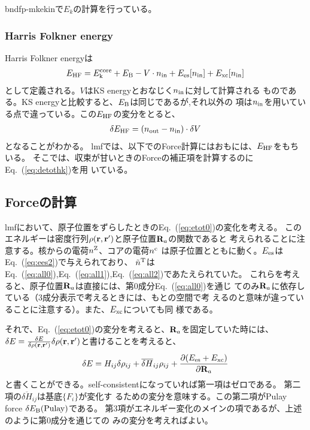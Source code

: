 \documentclass[a4paper,10pt,aip,onecolumn,amsmath,amssymb,floatfix,rmp]{revtex4-1}
\newcommand{\bfr}{{\bf r}}
\newcommand{\bfR}{{\bf R}}
\newcommand{\req}[1]{\mbox{Eq.~\!(\ref{#1})}}
\def\tnT{\tilde{n}^{\rm T}}
\def\tnT{\tilde{n}^{\rm T}}
\begin{document}
\noindent * bndfp-mkekinで$E_k$の計算を行っている。

\subsubsection{Harris Folkner energy}
Harris Folkner energyは
\begin{eqnarray}
E_{\rm HF} = E_{\rm k}^{\rm core} + E_{\rm B} - V \cdot n_{\rm in} + 
E_{\rm es}[n_{\rm in}] + E_{\rm xc}[n_{\rm in}]
\label{eq:etothf}
\end{eqnarray}
として定義される。$V$はKS energyとおなじく$n_{\rm in}$に対して計算される
ものである。KS energyと比較すると、$E_{\rm B}$は同じであるが,それ以外の
項は$n_{\rm in}$を用いている点で違っている。この$E_{\rm HF}$の変分をとると、
\begin{eqnarray}
\delta E_{\rm HF} = (n_{\rm out}-n_{\rm in})\cdot \delta V
\label{eq:detothk}
\end{eqnarray}
となることがわかる。
lmfでは、以下でのForce計算にはおもには、$E_{\rm HF}$をもちいる。
そこでは、収束が甘いときのForceの補正項を計算するのに\req{eq:detothk}を用
いている。


\subsection{Forceの計算}
lmfにおいて、原子位置をずらしたときの\req{eq:etot0}の変化を考える。
このエネルギーは密度行列$\rho(\bfr,\bfr')$と原子位置$\bfR_a$の関数であると
考えられることに注意する。核からの電荷$n^{\rm Z}$、コアの電荷$n^{\rm c}$
は原子位置とともに動く。$E_{\rm es}$は\req{eq:ees2}で与えられており、
$\tnT$は\req{eq:all0},\req{eq:all1},\req{eq:all2}であたえられていた。
これらを考えると、原子位置$\bfR_a$は直接には、第0成分\req{eq:all0}を通じ
てのみ$\bfR_a$に依存している（3成分表示で考えるときには、もとの空間で考
えるのと意味が違っていることに注意する）。また、$E_{\rm xc}$についても同
様である。

それで、\req{eq:etot0}の変分を考えると、$\bfR_a$を固定していた時には、
$\delta E = \frac{\delta E}{\delta \rho(\bfr,\bfr')}\delta
\rho(\bfr,\bfr')$と書けることを考えると、
\begin{eqnarray}
\delta E = H_{ij} \delta \rho_{ij} + \overline{\delta H}_{ij} \rho_{ij}
+\frac{\partial (E_{\rm es} + E_{\rm xc})}{\partial \bfR_a}
\label{eq:detot}
\end{eqnarray}
と書くことができる。self-consistentになっていれば第一項はゼロである。
第二項の$\overline{\delta H}_{ij}$は基底$\{F_i\}$が変化す
るための変分を意味する。この第二項がPulay force $\delta E_{\rm B}({\rm Pulay})$である。
第3項がエネルギー変化のメインの項であるが、上述のように第0成分を通じての
みの変分を考えればよい。
\end{document}
